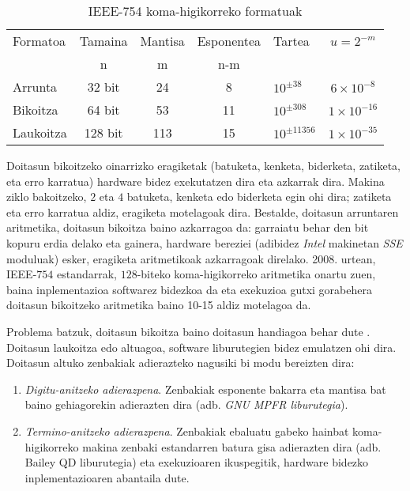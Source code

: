 \begin{table} [h!]
\caption{IEEE-754 koma-higikorreko formatuak}
\label{tab:koma-higikorreko-aritmetikak}       %
\centering
\begin{tabular}{ l c c c l c} 
 \hline
 Formatoa      &  Tamaina    & Mantisa   & Esponentea  & Tartea           &  $u=2^{-m}$          \\
               &    n        & m         & n-m         &                  &                      \\
   \hline
 Arrunta   & 32 bit      & 24  & 8  & $10^{\pm 38}$    &  $6 \times 10^{-8}$   \\	    
 Bikoitza  & 64 bit      & 53  & 11 & $10^{\pm 308}$   &  $1 \times 10^{-16}$   \\
 Laukoitza & 128 bit     & 113 & 15 & $10^{\pm 11356}$ &  $1 \times 10^{-35}$   \\
\hline
\end{tabular}
\end{table}


Doitasun bikoitzeko oinarrizko eragiketak (batuketa, kenketa, biderketa, zatiketa, eta erro karratua) hardware bidez exekutatzen dira \cite{Muller2009} eta azkarrak dira. Makina ziklo bakoitzeko, $2$ eta $4$ batuketa, kenketa edo biderketa egin ohi dira; zatiketa eta erro karratua aldiz, eragiketa motelagoak dira. Bestalde, doitasun arruntaren  aritmetika, doitasun bikoitza baino azkarragoa da: garraiatu behar den bit kopuru erdia delako eta gainera, hardware bereziei (adibidez \emph{Intel} makinetan \emph{SSE} moduluak) esker,  eragiketa aritmetikoak azkarragoak direlako. 2008. urtean, IEEE-$754$ estandarrak, $128$-biteko koma-higikorreko aritmetika onartu zuen, baina  inplementazioa  softwarez bidezkoa da eta exekuzioa gutxi gorabehera doitasun bikoitzeko aritmetika baino 10-15 aldiz motelagoa da.

Problema batzuk, doitasun bikoitza baino doitasun handiagoa behar dute \cite{Joldes2016}. Doitasun laukoitza edo altuagoa, software liburutegien bidez emulatzen ohi dira. Doitasun altuko zenbakiak adierazteko nagusiki bi modu bereizten dira:   

\begin{enumerate}
\item \emph{Digitu-anitzeko adierazpena}. Zenbakiak esponente bakarra eta mantisa bat baino gehiagorekin adierazten dira (adb. \emph{GNU MPFR liburutegia}).
\item \emph{Termino-anitzeko adierazpena}. Zenbakiak  ebaluatu gabeko hainbat koma-higikorreko makina zenbaki estandarren batura gisa adierazten dira (adb. Bailey QD liburutegia) eta exekuzioaren ikuspegitik, hardware bidezko inplementazioaren abantaila dute.    
\end{enumerate}

